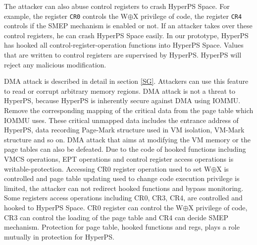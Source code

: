 The attacker can also abuse control registers to crash HyperPS Space. 
For example, the register \verb|CR0| controls the W$\oplus${X} privilege of code, the register \verb|CR4| controls if the SMEP mechanism is enabled or not. If an attacker takes over these control registers, he can crash HyperPS Space easily.
In our prototype, HyperPS has hooked all control-register-operation functions into HyperPS Space. Values that are written to control registers are supervised by HyperPS. HyperPS will reject any malicious modification.







\iffalse
DMA attack is described in detail in section \ref{SG}. Attackers can use this feature to read or corrupt arbitrary memory regions. DMA attack is not a threat to HyperPS, because HyperPS is inherently secure against DMA using IOMMU. Remove the corresponding mapping of the critical data from the page table which IOMMU uses. These critical unmapped data includes the entrance address of HyperPS, data recording Page-Mark structure used in VM isolation, VM-Mark structure and so on. DMA attack that aims at modifying the VM memory or the page tables can also be defeated.
Due to the code of hooked functions including VMCS operations, EPT operations and control register access operations is writable-protection. Accessing CR0 register operation used to set W$\oplus${X} is controlled and page table updating used to change code execution privilege is limited, the attacker can not redirect hooked functions and bypass monitoring.
Some registers access operations including CR0, CR3, CR4, are controlled and hooked to HyperPS Space. CR0 register can control the W$\oplus${X} privilege of code, CR3 can control the loading of the page table and CR4 can decide SMEP mechanism. Protection for page table, hooked functions and regs, plays a role mutually in protection for HyperPS. 

